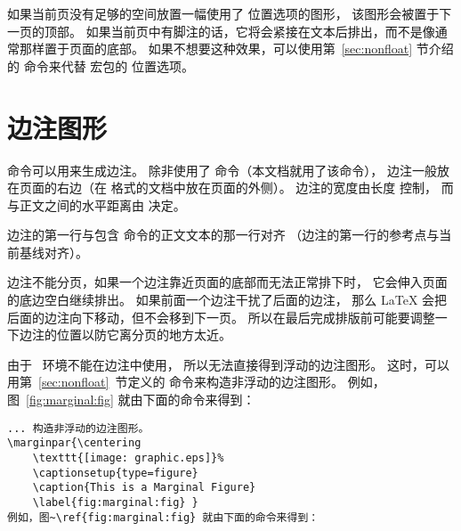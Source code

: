如果当前页没有足够的空间放置一幅使用了 \opt{[H]} 位置选项的图形，
该图形会被置于下一页的顶部。
如果当前页中有脚注的话，它将会紧接在文本后排出，而不是像通常那样置于页面的底部。
如果不想要这种效果，可以使用第~\ref{sec:nonfloat} 节介绍的  命令来代替  宏包的 \opt{[H]} 位置选项。


\section{边注图形}\label{sec:marginfigure}

 命令可以用来生成边注。
除非使用了  命令（本文档就用了该命令），
边注一般放在页面的右边（在  格式的文档中放在页面的外侧）。
边注的宽度由长度  控制，
而与正文之间的水平距离由  决定。

边注的第一行与包含  命令的正文文本的那一行对齐
（边注的第一行的参考点与当前基线对齐）。

边注不能分页，如果一个边注靠近页面的底部而无法正常排下时，
它会伸入页面的底边空白继续排出。
如果前面一个边注干扰了后面的边注，
那么 \LaTeX{} 会把后面的边注向下移动，但不会移到下一页。
所以在最后完成排版前可能要调整一下边注的位置以防它离分页的地方太近。

由于 ~环境不能在边注中使用，
所以无法直接得到浮动的边注图形。
这时，可以用第~\ref{sec:nonfloat}~节定义的  命令来构造非浮动的边注图形。
例如，图~\ref{fig:marginal:fig} 就由下面的命令来得到：
\begin{lstlisting}
... 构造非浮动的边注图形。
\marginpar{\centering 
	\texttt{[image: graphic.eps]}% 
	\captionsetup{type=figure}
	\caption{This is a Marginal Figure} 
	\label{fig:marginal:fig} }
例如，图~\ref{fig:marginal:fig} 就由下面的命令来得到：
\end{lstlisting}

